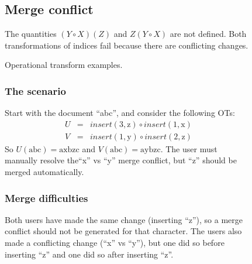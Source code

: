 \documentclass[11pt,titlepage]{article}
\begin{document}
\begin{figure}[h]
\begin{minipage}{\textwidth}
\begin{multicols}{2}
      \subsection*{Merge conflict}
      The quantities \((Y \circ X)(Z)\) and \(Z(Y \circ X)\) are not
      defined.  Both transformations of indices fail because there
      are conflicting changes.
    \end{multicols}
  \end{minipage}
  \caption{Operational transform examples.}
  \label{fig:ot}
\end{figure}

\begin{figure}[h]
  \centering
  \begin{minipage}{\textwidth}
    \begin{multicols}{2}
      \subsubsection*{The scenario}
      Start with the document ``abc'', and consider the following OTs:
      \begin{eqnarray*}
        U &=& insert(3, \mathrm{z}) \circ insert(1, \mathrm{x}) \\
        V &=& insert(1, \mathrm{y}) \circ insert(2, \mathrm{z})
      \end{eqnarray*}
      So \(U(\mathrm{abc}) = \mathrm{axbzc}\) and \(V(\mathrm{abc}) =
      \mathrm{aybzc}\).  The user must manually resolve the``x'' vs
      ``y'' merge conflict, but ``z'' should be merged automatically.
      \subsubsection*{Merge difficulties}
      Both users have made the same change (inserting ``z''), so a
      merge conflict should not be generated for that character.  The
      users also made a conflicting change (``x'' vs ``y''), but one
      did so before inserting ``z'' and one did so after inserting
      ``z''.

\end{multicols}
\end{minipage}
\end{figure}
\end{document}
